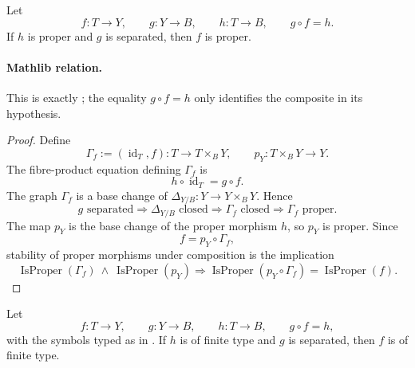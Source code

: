 \begin{lemma}
  \label{lemma:nagata-proper-to-separated-target}

  Let
  \[
    f\colon T\to Y,\qquad g\colon Y\to B,\qquad h\colon T\to B,
    \qquad g\circ f=h.
  \]
  If $h$ is proper and $g$ is separated, then $f$ is proper.

  \paragraph{Mathlib relation.}
  This is exactly
  \texttt{}; the equality
  $g\circ f=h$ only identifies the composite in its hypothesis.
\end{lemma}

\begin{proof}
  Define
  \[
    \Gamma_f:=(\operatorname{id}_T,f)\colon T\to T\times_BY,
    \qquad p_Y\colon T\times_BY\to Y.
  \]
  The fibre-product equation defining $\Gamma_f$ is
  \[
    h\circ\operatorname{id}_T=g\circ f.
  \]
  The graph $\Gamma_f$ is a base change of
  $\Delta_{Y/B}\colon Y\to Y\times_BY$.  Hence
  \[
    g\text{ separated}
      \Longrightarrow\Delta_{Y/B}\text{ closed}
      \Longrightarrow\Gamma_f\text{ closed}
      \Longrightarrow\Gamma_f\text{ proper}.
  \]
  The map $p_Y$ is the base change of the proper morphism $h$, so $p_Y$ is
  proper.  Since
  \[
    f=p_Y\circ\Gamma_f,
  \]
  stability of proper morphisms under composition is the implication
  \[
    \operatorname{IsProper}(\Gamma_f)
      \ \wedge\ 
    \operatorname{IsProper}(p_Y)
      \Longrightarrow
    \operatorname{IsProper}(p_Y\circ\Gamma_f)
      =\operatorname{IsProper}(f).
  \]
\end{proof}

\begin{lemma}
  \label{lemma:nagata-finite-type-to-separated-target}

  Let
  \[
    f\colon T\to Y,\qquad
    g\colon Y\to B,\qquad
    h\colon T\to B,\qquad
    g\circ f=h,                                                    \tag{FTST0}
  \]
  with the symbols typed as in
  .  If \(h\) is of finite
  type and \(g\) is separated, then \(f\) is of finite type.
\end{lemma}

